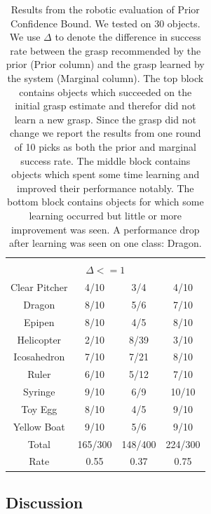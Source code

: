 \documentclass{article}
\newcommand{\algorithmDTxt}{Prior Confidence Bound\xspace}
\begin{document}
\begin{table}
\begin{tabular}{cccc}
\midrule
\\
\multicolumn{4}{c}{$\Delta <= 1$} \\
\midrule
Clear Pitcher       & 4/10          &  3/4         &  4/10 \\
Dragon    	    & 8/10          &  5/6         &  7/10 \\
Epipen    	    & 8/10          &  4/5         &  8/10 \\
Helicopter    	    & 2/10          &  8/39        &  3/10 \\
Icosahedron    	    & 7/10          &  7/21        &  8/10 \\
Ruler    	    & 6/10          &  5/12        &  7/10 \\
Syringe    	    & 9/10          &  6/9         &  10/10\\
Toy Egg    	    & 8/10          &  4/5         &  9/10 \\
Yellow Boat    	    & 9/10          &  5/6         &  9/10 \\
\midrule
Total		    & 165/300       &  148/400     & 224/300\\
Rate		    & 0.55          &  0.37        & 0.75\\
\bottomrule
\end{tabular}
\caption{Results from the robotic evaluation of \algorithmDTxt. We tested on 30 objects. We use
$\Delta$ to denote the difference in success rate between the grasp recommended
by the prior (Prior column) and the grasp learned by the system (Marginal
column). The top block contains objects which succeeded on the initial grasp
estimate and therefor did not learn a new grasp. Since the grasp did not change
we report the results from one round of 10 picks as both the prior and marginal
success rate.  The middle block contains objects which spent some time learning
and improved their performance notably. The bottom block contains objects for
which some learning occurred but little or more improvement was seen. A
performance drop after learning was seen on one class:
Dragon.\label{table:robot_results}}
\end{table}

\subsection{Discussion}
\end{document}
